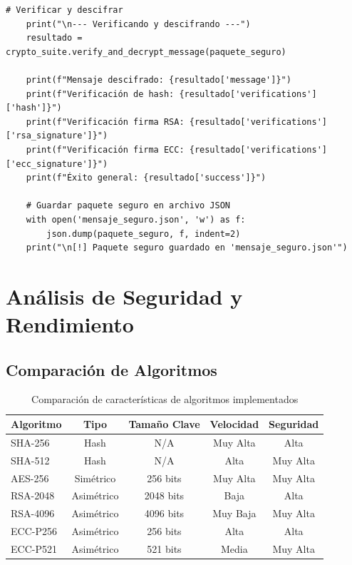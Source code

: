 \documentclass[12pt,a4paper]{article}
\begin{document}
\begin{lstlisting}[caption=Suite completa de cifrado integrando todas las funcionalidades]
    # Verificar y descifrar
    print("\n--- Verificando y descifrando ---")
    resultado = crypto_suite.verify_and_decrypt_message(paquete_seguro)
    
    print(f"Mensaje descifrado: {resultado['message']}")
    print(f"Verificación de hash: {resultado['verifications']['hash']}")
    print(f"Verificación firma RSA: {resultado['verifications']['rsa_signature']}")
    print(f"Verificación firma ECC: {resultado['verifications']['ecc_signature']}")
    print(f"Éxito general: {resultado['success']}")
    
    # Guardar paquete seguro en archivo JSON
    with open('mensaje_seguro.json', 'w') as f:
        json.dump(paquete_seguro, f, indent=2)
    print("\n[!] Paquete seguro guardado en 'mensaje_seguro.json'")
\end{lstlisting}

\newpage

\section{Análisis de Seguridad y Rendimiento}

\subsection{Comparación de Algoritmos}

\begin{table}[h]
	\centering
	\caption{Comparación de características de algoritmos implementados}
	\begin{tabular}{|l|c|c|c|c|}
		\hline
		\textbf{Algoritmo} & \textbf{Tipo} & \textbf{Tamaño Clave} & \textbf{Velocidad} & \textbf{Seguridad} \\
		\hline
		SHA-256            & Hash          & N/A                   & Muy Alta           & Alta               \\
		SHA-512            & Hash          & N/A                   & Alta               & Muy Alta           \\
		AES-256            & Simétrico     & 256 bits              & Muy Alta           & Muy Alta           \\
		RSA-2048           & Asimétrico    & 2048 bits             & Baja               & Alta               \\
		RSA-4096           & Asimétrico    & 4096 bits             & Muy Baja           & Muy Alta           \\
		ECC-P256           & Asimétrico    & 256 bits              & Alta               & Alta               \\
		ECC-P521           & Asimétrico    & 521 bits              & Media              & Muy Alta           \\
		\hline
	\end{tabular}
\end{table}
\end{document}
